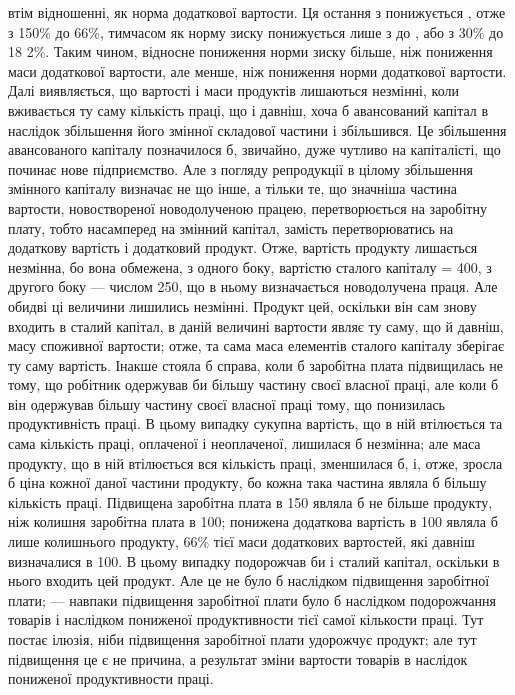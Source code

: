 \parcont{}  %
втім відношенні, як норма додаткової вартости. Ця остання з  понижується
, отже з 150\% до 66\%, тимчасом як норму зиску понижується
лише з  до , або з 30\% до 18 2\%. Таким чином, відносне пониження
норми зиску більше, ніж пониження маси додаткової вартости, але менше, ніж
пониження норми додаткової вартости. Далі виявляється, що вартості і маси продуктів
лишаються незмінні, коли вживається ту саму кількість праці, що і давніш,
хоча б авансований капітал в наслідок збільшення його змінної складової частини
і збільшився. Це збільшення авансованого капіталу позначилося б, звичайно,
дуже чутливо на капіталісті, що починає нове підприємство. Але з погляду
репродукції в цілому збільшення змінного капіталу визначає не що інше, а тільки
те, що значніша частина вартости, новоствореної новодолученою працею, перетворюється на заробітну
плату, тобто насамперед на змінний капітал, замість
перетворюватись на додаткову вартість і додатковий продукт. Отже, вартість
продукту лишається незмінна, бо вона обмежена, з одного боку, вартістю
сталого капіталу = 400, з другого боку — числом 250, що в ньому визначається
новодолучена праця. Але обидві ці величини лишились незмінні. Продукт цей,
оскільки він сам знову входить в сталий капітал, в даній величині вартости
являє ту саму, що й давніш, масу споживної вартости; отже, та сама маса
елементів сталого капіталу зберігає ту саму вартість. Інакше стояла б справа,
коли б заробітна плата підвищилась не тому, що робітник одержував би більшу
частину своєї власної праці, але коли б він одержував більшу частину своєї
власної праці тому, що понизилась продуктивність праці. В цьому випадку сукупна
вартість, що в ній втілюється та сама кількість праці, оплаченої і неоплаченої,
лишилася б незмінна; але маса продукту, що в ній втілюється вся
кількість праці, зменшилася б, і, отже, зросла б ціна кожної даної частини
продукту, бо кожна така частина являла б більшу кількість праці. Підвищена
заробітна плата в 150 являла б не більше продукту, ніж колишня заробітна
плата в 100; понижена додаткова вартість в 100 являла б лише  колишнього
продукту, 66\% тієї маси додаткових вартостей, які давніш визначалися
в 100. В цьому випадку подорожчав би і сталий капітал, оскільки в нього
входить цей продукт. Але це не було б наслідком підвищення заробітної плати;
— навпаки підвищення заробітної плати було б наслідком подорожчання
товарів і наслідком пониженої продуктивности тієї самої кількости праці. Тут
постає ілюзія, ніби підвищення заробітної плати удорожчує продукт; але тут
підвищення це є не причина, а результат зміни вартости товарів в наслідок
пониженої продуктивности праці.


